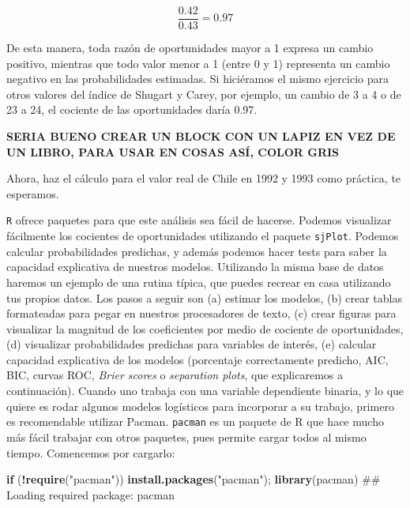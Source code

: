 \documentclass[]{book}
\newenvironment{Shaded}{\begin{snugshade}}{\end{snugshade}}
\newcommand{\KeywordTok}[1]{\textcolor[rgb]{0.13,0.29,0.53}{\textbf{#1}}}
\newcommand{\StringTok}[1]{\textcolor[rgb]{0.31,0.60,0.02}{#1}}
\newcommand{\ControlFlowTok}[1]{\textcolor[rgb]{0.13,0.29,0.53}{\textbf{#1}}}
\newcommand{\OperatorTok}[1]{\textcolor[rgb]{0.81,0.36,0.00}{\textbf{#1}}}
\newcommand{\NormalTok}[1]{#1}
\begin{document}
\[\frac {0.42}{0.43}=0.97\]

De esta manera, toda razón de oportunidades mayor a 1 expresa un cambio
positivo, mientras que todo valor menor a 1 (entre 0 y 1) representa un
cambio negativo en las probabilidades estimadas. Si hiciéramos el mismo
ejercicio para otros valores del índice de Shugart y Carey, por ejemplo,
un cambio de 3 a 4 o de 23 a 24, el cociente de las oportunidades daría
0.97.

\textbf{SERIA BUENO CREAR UN BLOCK CON UN LAPIZ EN VEZ DE UN LIBRO, PARA
USAR EN COSAS ASÍ, COLOR GRIS}

\begin{books}
Ahora, haz el cálculo para el valor real de Chile en 1992 y 1993 como
práctica, te esperamos.
\end{books}

\texttt{R} ofrece paquetes para que este análisis sea fácil de hacerse.
Podemos visualizar fácilmente los cocientes de oportunidades utilizando
el paquete \texttt{sjPlot}. Podemos calcular probabilidades predichas, y
además podemos hacer tests para saber la capacidad explicativa de
nuestros modelos. Utilizando la misma base de datos haremos un ejemplo
de una rutina típica, que puedes recrear en casa utilizando tus propios
datos. Los pasos a seguir son (a) estimar los modelos, (b) crear tablas
formateadas para pegar en nuestros procesadores de texto, (c) crear
figuras para visualizar la magnitud de los coeficientes por medio de
cociente de oportunidades, (d) visualizar probabilidades predichas para
variables de interés, (e) calcular capacidad explicativa de los modelos
(porcentaje correctamente predicho, AIC, BIC, curvas ROC, \emph{Brier
scores} o \emph{separation plots}, que explicaremos a continuación).
Cuando uno trabaja con una variable dependiente binaria, y lo que quiere
es rodar algunos modelos logísticos para incorporar a su trabajo,
primero es recomendable utilizar Pacman. \texttt{pacman} es un paquete
de R que hace mucho más fácil trabajar con otros paquetes, pues permite
cargar todos al mismo tiempo. Comencemos por cargarlo:

\begin{Shaded}
\begin{Highlighting}[]
\ControlFlowTok{if}\NormalTok{ (}\OperatorTok{!}\KeywordTok{require}\NormalTok{(}\StringTok{"pacman"}\NormalTok{))}
    \KeywordTok{install.packages}\NormalTok{(}\StringTok{"pacman"}\NormalTok{); }\KeywordTok{library}\NormalTok{(pacman)  }
\NormalTok{## Loading required package: pacman}
\end{Highlighting}
\end{Shaded}
\end{document}
